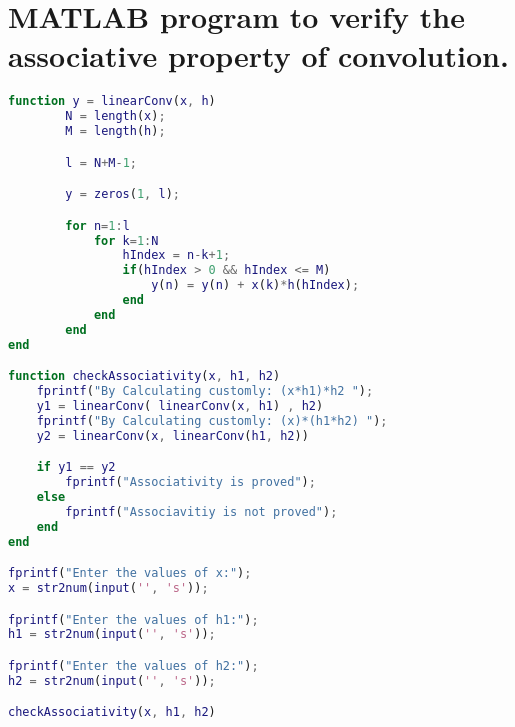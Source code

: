 \documentclass{article}
\begin{document}
\section{MATLAB program to verify the associative property of convolution.}
\begin{lstlisting}[language=matlab, caption=MATLAB program to verify the associative property of convolution]
function y = linearConv(x, h)
        N = length(x);
        M = length(h);

        l = N+M-1;

        y = zeros(1, l);

        for n=1:l
            for k=1:N
                hIndex = n-k+1;
                if(hIndex > 0 && hIndex <= M)
                    y(n) = y(n) + x(k)*h(hIndex);
                end
            end
        end
end

function checkAssociativity(x, h1, h2)
    fprintf("By Calculating customly: (x*h1)*h2 ");
    y1 = linearConv( linearConv(x, h1) , h2)
    fprintf("By Calculating customly: (x)*(h1*h2) ");
    y2 = linearConv(x, linearConv(h1, h2))

    if y1 == y2
        fprintf("Associativity is proved");
    else
        fprintf("Associavitiy is not proved");
    end
end

fprintf("Enter the values of x:");
x = str2num(input('', 's'));

fprintf("Enter the values of h1:");
h1 = str2num(input('', 's'));

fprintf("Enter the values of h2:");
h2 = str2num(input('', 's'));

checkAssociativity(x, h1, h2)
\end{lstlisting}
\end{document}
